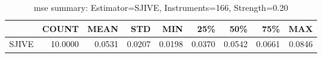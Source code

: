 \begin{table}[ht]
\centering
\caption{mse summary: Estimator=SJIVE, Instruments=166, Strength=0.20}
\begin{tabular}{lrrrrrrrr}
\toprule
 & COUNT & MEAN & STD & MIN & 25\% & 50\% & 75\% & MAX \\
\midrule
SJIVE & 10.0000 & 0.0531 & 0.0207 & 0.0198 & 0.0370 & 0.0542 & 0.0661 & 0.0846 \\
\bottomrule
\end{tabular}
\end{table}
